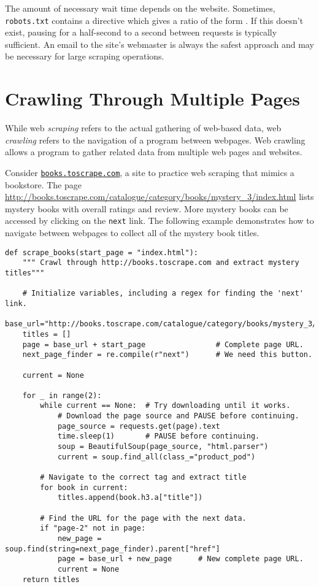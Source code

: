The amount of necessary wait time depends on the website.
Sometimes, \texttt{robots.txt} contains a  directive which gives a ratio of the form .
If this doesn't exist, pausing for a half-second to a second between requests is typically sufficient.
An email to the site's webmaster is always the safest approach and may be necessary for large scraping operations.


\section*{Crawling Through Multiple Pages} %

While web \emph{scraping} refers to the actual gathering of web-based data, web \emph{crawling} refers to the navigation of a program between webpages.
Web crawling allows a program to gather related data from multiple web pages and websites.

Consider \href{http://books.toscrape.com}{\texttt{books.toscrape.com}}, a site to practice web scraping that mimics a bookstore.
The page \url{http://books.toscrape.com/catalogue/category/books/mystery_3/index.html} lists mystery books with overall ratings and review.
More mystery books can be accessed by clicking on the \texttt{next} link.
The following example demonstrates how to navigate between webpages to collect all of the mystery book titles.

\begin{lstlisting}
def scrape_books(start_page = "index.html"):
    """ Crawl through http://books.toscrape.com and extract mystery titles"""

    # Initialize variables, including a regex for finding the 'next' link.
    base_url="http://books.toscrape.com/catalogue/category/books/mystery_3/"
    titles = []
    page = base_url + start_page                # Complete page URL.
    next_page_finder = re.compile(r"next")      # We need this button.

    current = None

    for _ in range(2):
        while current == None:  # Try downloading until it works.
            # Download the page source and PAUSE before continuing.
            page_source = requests.get(page).text
            time.sleep(1)       # PAUSE before continuing.
            soup = BeautifulSoup(page_source, "html.parser")
            current = soup.find_all(class_="product_pod")

        # Navigate to the correct tag and extract title
        for book in current:
            titles.append(book.h3.a["title"])

        # Find the URL for the page with the next data.
        if "page-2" not in page:
            new_page = soup.find(string=next_page_finder).parent["href"]
            page = base_url + new_page      # New complete page URL.
            current = None
    return titles

\end{lstlisting}

